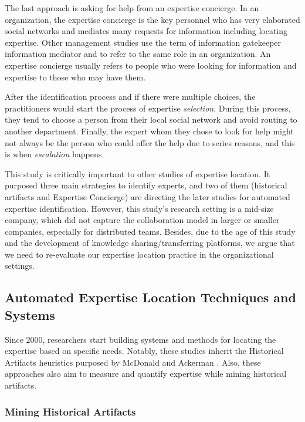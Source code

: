 The last approach is asking for help from an expertise concierge. In an organization, the expertise concierge is the key personnel who has very elaborated social networks and mediates many requests for information including locating expertise. Other management studies use the term of information gatekeeper \cite{allen1977managing} information mediator \cite{ehrlich1994turning} and \cite{paepcke1996information} to refer to the same role in an organization. An expertise concierge usually refers to people who were looking for information and expertise to those who may have them.

After the identification process and if there were multiple choices, the practitioners would start the process of expertise \textit{selection}. During this process, they tend to choose a person from their local social network and avoid routing to another department. Finally, the expert whom they chose to look for help might not always be the person who could offer the help due to series reasons, and this is when \textit{escalation} happens.

This study is critically important to other studies of expertise location. It purposed three main strategies to identify experts, and two of them (historical artifacts and Expertise Concierge) are directing the later studies for automated expertise identification. However, this study's research setting is a mid-size company, which did not capture the collaboration model in larger or smaller companies, especially for distributed teams. Besides, due to the age of this study and the development of knowledge sharing/transferring platforms, we argue that we need to re-evaluate our expertise location practice in the organizational settings. 

\subsection{Automated Expertise Location Techniques and Systems}

Since 2000, researchers start building systems and methods for locating the expertise based on specific needs. Notably, these studies inherit the Historical Artifacts heuristics purposed by McDonald and Ackerman \cite{mcdonald1998just}. Also, these approaches also aim to measure and quantify expertise while mining historical artifacts.

\subsubsection{Mining Historical Artifacts}

